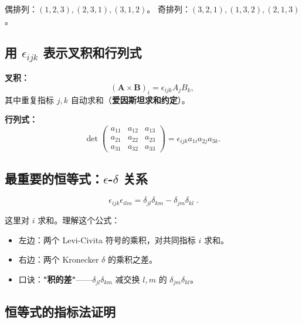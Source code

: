 偶排列：$(1,2,3), (2,3,1), (3,1,2)$。
奇排列：$(3,2,1), (1,3,2), (2,1,3)$。

\subsection{用 \texorpdfstring{$\epsilon_{ijk}$}{εijk} 表示叉积和行列式}

\textbf{叉积：}
\[
(\mathbf{A}\times\mathbf{B})_i = \epsilon_{ijk}A_jB_k,
\]
其中重复指标 $j,k$ 自动求和（\textbf{爱因斯坦求和约定}）。

\textbf{行列式：}
\[
\det\begin{pmatrix}
a_{11} & a_{12} & a_{13}\\
a_{21} & a_{22} & a_{23}\\
a_{31} & a_{32} & a_{33}
\end{pmatrix}
= \epsilon_{ijk}a_{1i}a_{2j}a_{3k}.
\]

\subsection{最重要的恒等式：\texorpdfstring{$\epsilon$-$\delta$}{ε-δ} 关系}

\[
\boxed{\;\epsilon_{ijk}\epsilon_{ilm} = \delta_{jl}\delta_{km} - \delta_{jm}\delta_{kl}\;}.
\label{eq:epsilon_delta}
\]

这里对 $i$ 求和。理解这个公式：
\begin{itemize}
\item 左边：两个 Levi-Civita 符号的乘积，对共同指标 $i$ 求和。
\item 右边：两个 Kronecker $\delta$ 的乘积之差。
\item 口诀：\textbf{"积的差"}——$\delta_{jl}\delta_{km}$ 减交换 $l,m$ 的 $\delta_{jm}\delta_{kl}$。
\end{itemize}

\subsection{恒等式的指标法证明}

